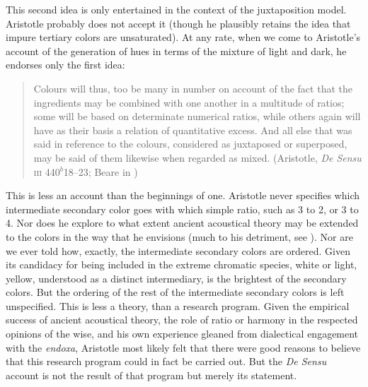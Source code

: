 This second idea is only entertained in the context of the juxtaposition model. Aristotle probably does not accept it (though he plausibly retains the idea that impure tertiary colors are unsaturated). At any rate, when we come to Aristotle's account of the generation of hues in terms of the mixture of light and dark, he endorses only the first idea:
\begin{quote}
	Colours will thus, too be many in number on account of the fact that the ingredients may be combined with one another in a multitude of ratios; some will be based on determinate numerical ratios, while others again will have as their basis a relation of quantitative excess. And all else that was said in reference to the colours, considered as juxtaposed or superposed, may be said of them likewise when regarded as mixed. (Aristotle, \emph{De Sensu} \textsc{iii} 440\( ^{b} \)18--23; Beare in \citealt[10]{Barnes:1984uq})
\end{quote}

This is less an account than the beginnings of one. Aristotle never specifies which intermediate secondary color goes with which simple ratio, such as 3 to 2, or 3 to 4. Nor does he explore to what extent ancient acoustical theory may be extended to the colors in the way that he envisions (much to his detriment, see \citealt{Sorabji:2022qf}). Nor are we ever told how, exactly, the intermediate secondary colors are ordered. Given its candidacy for being included in the extreme chromatic species, white or light, yellow, understood as a distinct intermediary, is the brightest of the secondary colors. But the ordering of the rest of the intermediate secondary colors is left unspecified. This is less a theory, than a research program. Given the empirical success of ancient acoustical theory, the role of ratio or harmony in the respected opinions of the wise, and his own experience gleaned from dialectical engagement with the \emph{endoxa}, Aristotle most likely felt that there were good reasons to believe that this research program could in fact be carried out. But the \emph{De Sensu} account is not the result of that program but merely its statement.


